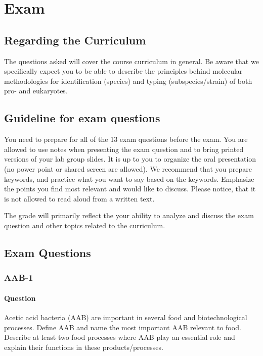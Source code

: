 \setlength{\headheight}{12.71342pt}
\addtolength{\topmargin}{-0.71342pt}

\chapter{Exam}

\section{Regarding the Curriculum}
The questions asked will cover the course curriculum in general. Be aware that we specifically expect you to be able to describe the principles behind molecular methodologies for identification (species) and typing (subspecies/strain) of both pro- and eukaryotes.  

\section{Guideline for exam questions}
You need to prepare for all of the 13 exam questions before the exam. You are allowed to use notes when presenting the exam question and to bring printed versions of your lab group slides. It is up to you to organize the oral presentation (no power point or shared screen are allowed). We recommend that you prepare keywords, and practice what you want to say based on the keywords. Emphasize the points you find most relevant and would like to discuss. Please notice, that it is not allowed to read aloud from a written text.  

The grade will primarily reflect the your ability to analyze and discuss the exam question and other topics related to the curriculum. 

\section{Exam Questions}

\subsection{AAB-1}
\subsubsection*{Question}
Acetic acid bacteria (AAB) are important in several food and biotechnological processes. Define AAB and name the most important AAB relevant to food. Describe at least two food processes where AAB play an essential role and explain their functions in these products/processes.

